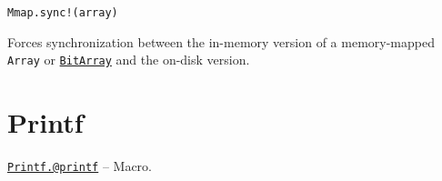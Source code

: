 \begin{adjustwidth}{2em}{0pt}


\begin{verbatim}
Mmap.sync!(array)
\end{verbatim}

Forces synchronization between the in-memory version of a memory-mapped \texttt{Array} or \hyperlink{18015155802543401629}{\texttt{BitArray}} and the on-disk version.



\end{adjustwidth}

\hypertarget{1309003987218303578}{}


\chapter{Printf}


\hypertarget{13954719910189591998}{}
\hyperlink{13954719910189591998}{\texttt{Printf.@printf}}  -- {Macro.}

